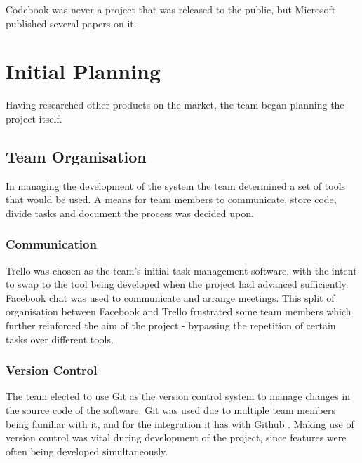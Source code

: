 \documentclass[a4paper]{l3proj}
\begin{document}
Codebook was never a project that was released to the public, but Microsoft published several papers on it.

\chapter{Initial Planning}
\label{initialPlanning}
Having researched other products on the market, the team began planning the project itself. 

\section{Team Organisation}
\label{organisation}

In managing the development of the system the team determined a set of tools that would be used.  A means for team members to communicate, store code, divide tasks and document the process was decided upon.

\subsection{Communication}
\label{communication}
Trello \cite{site:ourTrello} was chosen as the team's initial task management software, with the intent to swap to the tool being developed when the project had advanced sufficiently. Facebook chat was used to communicate and arrange meetings.  This split of organisation between Facebook and Trello frustrated some team members which further reinforced the aim of the project - bypassing the repetition of certain tasks over different tools.

\subsection{Version Control}
\label{version}

The team elected to use Git \cite{site:github} as the version control system to manage changes in the source code of the software. Git was used due to multiple team members being familiar with it, and for the integration it has with Github \cite{site:ourGithub}. Making use of version control was vital during development of the project, since features were often being developed simultaneously.
\end{document}

